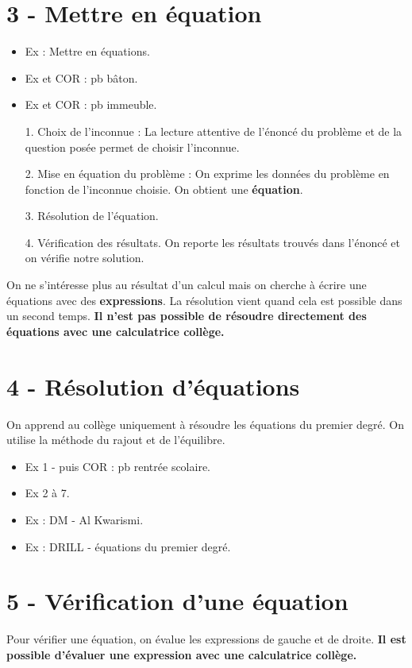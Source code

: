 \documentclass[11pt]{article}
\begin{document}
\section*{3 - Mettre en équation}

\begin{itemize}
  \item Ex : Mettre en équations.
  \item Ex et COR : pb bâton.
  \item Ex et COR : pb immeuble.   
\end{itemize}


\begin{enumerate}
  \item[1.] Choix de l'inconnue : La lecture attentive de l'énoncé du problème et de la question posée permet de choisir l'inconnue. 
  \item[2.] Mise en équation du problème : On exprime les données du problème en fonction de l'inconnue choisie. On obtient une \textbf{équation}.
  \item[3.] Résolution de l'équation.
  \item[4.] Vérification des résultats. On reporte les résultats trouvés dans l'énoncé et on vérifie notre solution.
\end{enumerate}

On ne s'intéresse plus au résultat d'un calcul mais on cherche à écrire une équations avec des \textbf{expressions}. La résolution vient quand cela est possible dans un second temps. \textbf{Il n'est pas possible de résoudre directement des équations avec une calculatrice collège.}

\section*{4 - Résolution d'équations}

On apprend au collège uniquement à résoudre les équations du premier degré. On utilise la méthode du rajout et de l'équilibre.

\begin{itemize}
  \item Ex 1 - puis COR : pb rentrée scolaire.
  \item Ex 2 à 7.
  \item Ex : DM - Al Kwarismi. 
  \item Ex : DRILL - équations du premier degré.
\end{itemize}

\section*{5 - Vérification d'une équation}

Pour vérifier une équation, on évalue les expressions de gauche et de droite. \textbf{Il est possible d'évaluer une expression avec une calculatrice collège.}
\end{document}
